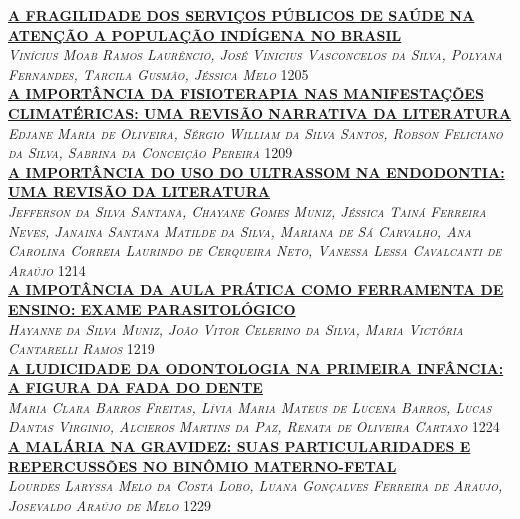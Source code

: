 \noindent \textsc{\hyperlink{trabalhos/250238.pdf.1}{\textbf{A FRAGILIDADE DOS SERVIÇOS PÚBLICOS DE SAÚDE NA ATENÇÃO A POPULAÇÃO INDÍGENA NO BRASIL}}}\\ 
\noindent \textsc{\textit{Vinícius Moab Ramos Laurêncio, José Vinicius Vasconcelos da Silva, Polyana Fernandes, Tarcila Gusmão, Jéssica Melo}} \hfill 1205\\ 

\noindent \textsc{\hyperlink{trabalhos/247925.pdf.1}{\textbf{A IMPORTÂNCIA DA FISIOTERAPIA NAS MANIFESTAÇÕES CLIMATÉRICAS: UMA REVISÃO NARRATIVA DA LITERATURA}}}\\ 
\noindent \textsc{\textit{Edjane Maria de Oliveira, Sérgio William da Silva Santos, Robson Feliciano da Silva, Sabrina da Conceição Pereira}} \hfill 1209\\ 

\noindent \textsc{\hyperlink{trabalhos/250329.pdf.1}{\textbf{A IMPORTÂNCIA DO USO DO ULTRASSOM NA ENDODONTIA: UMA REVISÃO DA LITERATURA}}}\\ 
\noindent \textsc{\textit{Jefferson da Silva Santana, Chayane Gomes Muniz, Jéssica Tainá Ferreira Neves, Janaina Santana Matilde da Silva, Mariana de Sá Carvalho, Ana Carolina Correia Laurindo de Cerqueira Neto, Vanessa Lessa Cavalcanti de Araújo}} \hfill 1214\\ 

\noindent \textsc{\hyperlink{trabalhos/251846.pdf.1}{\textbf{A IMPOTÂNCIA DA AULA PRÁTICA COMO FERRAMENTA DE ENSINO: EXAME PARASITOLÓGICO}}}\\ 
\noindent \textsc{\textit{Hayanne da Silva Muniz, João Vitor Celerino da Silva, Maria Victória Cantarelli Ramos}} \hfill 1219\\ 

\noindent \textsc{\hyperlink{trabalhos/251021.pdf.1}{\textbf{A LUDICIDADE DA ODONTOLOGIA NA PRIMEIRA INFÂNCIA: A FIGURA DA FADA DO DENTE }}}\\ 
\noindent \textsc{\textit{Maria Clara Barros Freitas, Lívia Maria Mateus de Lucena Barros, Lucas Dantas Virginio, Alcieros Martins da Paz, Renata de Oliveira Cartaxo}} \hfill 1224\\ 

\noindent \textsc{\hyperlink{trabalhos/251299.pdf.1}{\textbf{A MALÁRIA NA GRAVIDEZ: SUAS PARTICULARIDADES E REPERCUSSÕES NO BINÔMIO MATERNO-FETAL}}}\\ 
\noindent \textsc{\textit{Lourdes Laryssa Melo da Costa Lobo, Luana Gonçalves Ferreira de Araujo, Josevaldo Araújo de Melo}} \hfill 1229\\ 

